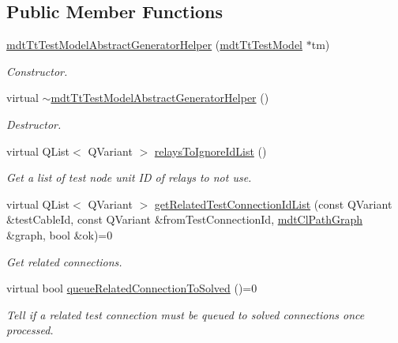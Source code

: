 \subsection*{Public Member Functions}
\begin{DoxyCompactItemize}
\item 
\hyperlink{classmdt_tt_test_model_abstract_generator_helper_a257b2aa51540622af8e8e1f8bd4e755b}{mdt\-Tt\-Test\-Model\-Abstract\-Generator\-Helper} (\hyperlink{classmdt_tt_test_model}{mdt\-Tt\-Test\-Model} $\ast$tm)
\begin{DoxyCompactList}\small\item\em Constructor. \end{DoxyCompactList}\item 
virtual \hyperlink{classmdt_tt_test_model_abstract_generator_helper_aec2d231336554fc0bb9faa8dd6fee8c2}{$\sim$mdt\-Tt\-Test\-Model\-Abstract\-Generator\-Helper} ()
\begin{DoxyCompactList}\small\item\em Destructor. \end{DoxyCompactList}\item 
virtual Q\-List$<$ Q\-Variant $>$ \hyperlink{classmdt_tt_test_model_abstract_generator_helper_aa0021e5365e7f92b0feeeb5cab544373}{relays\-To\-Ignore\-Id\-List} ()
\begin{DoxyCompactList}\small\item\em Get a list of test node unit I\-D of relays to not use. \end{DoxyCompactList}\item 
virtual Q\-List$<$ Q\-Variant $>$ \hyperlink{classmdt_tt_test_model_abstract_generator_helper_a17006a0517ad90e9a21e1e45775591aa}{get\-Related\-Test\-Connection\-Id\-List} (const Q\-Variant \&test\-Cable\-Id, const Q\-Variant \&from\-Test\-Connection\-Id, \hyperlink{classmdt_cl_path_graph}{mdt\-Cl\-Path\-Graph} \&graph, bool \&ok)=0
\begin{DoxyCompactList}\small\item\em Get related connections. \end{DoxyCompactList}\item 
virtual bool \hyperlink{classmdt_tt_test_model_abstract_generator_helper_a11c9add674333027f713b45a71cc5f60}{queue\-Related\-Connection\-To\-Solved} ()=0
\begin{DoxyCompactList}\small\item\em Tell if a related test connection must be queued to solved connections once processed. \end{DoxyCompactList}\item 

\end{DoxyCompactItemize}
